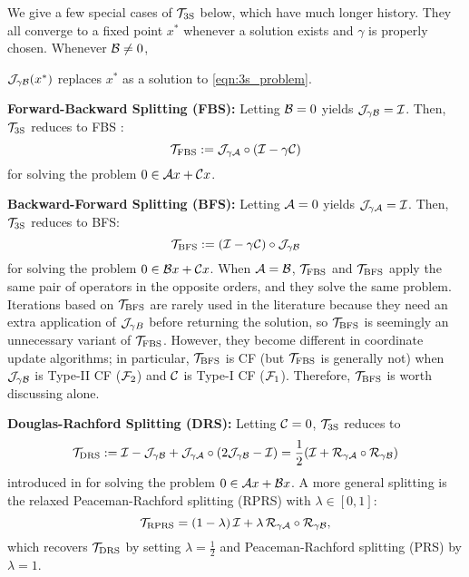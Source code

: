 We give a few special cases of ${{\mathcal{T}}_{\mathrm{3S}}}$ below, which have much longer history. They all converge to a fixed point $x^*$ whenever a solution exists and $\gamma$ is properly chosen. Whenever ${\mathcal{B}}\neq 0$, {${\mathcal{J}}_{\gamma {\mathcal{B}}}(x^*)$ replaces $x^*$  as a solution to \eqref{eqn:3s_problem}.

 \textbf{Forward-Backward Splitting (FBS):} Letting ${\mathcal{B}}=0$ yields ${\mathcal{J}}_{\gamma{\mathcal{B}}}={\mathcal{I}}$. Then, ${{\mathcal{T}}_{\mathrm{3S}}}$ reduces to FBS \cite{passty1979FBS}:
 \begin{equation}\label{eq:FBS}
 \TFBS:=\cJ_{\gamma \cA}\circ(\cI-\gamma \cC)
 \end{equation}
 for solving the problem $0\in{\mathcal{A}} x+{\mathcal{C}} x$.

\textbf{Backward-Forward Splitting (BFS):} Letting ${\mathcal{A}}=0$ yields ${\mathcal{J}}_{\gamma{\mathcal{A}}}={\mathcal{I}}$. Then, ${{\mathcal{T}}_{\mathrm{3S}}}$ reduces to BFS:
  \begin{equation}\label{eq:BFS}\TBFS:=(\cI-\gamma \cC)\circ \cJ_{\gamma \cB}
  \end{equation}
for solving the problem $0\in{\mathcal{B}} x+{\mathcal{C}} x$. When ${\mathcal{A}}={\mathcal{B}}$, ${{\mathcal{T}}_{\mathrm{FBS}}}$ and ${{\mathcal{T}}_{\mathrm{BFS}}}$ apply the same pair of operators in the opposite orders, and they solve the same problem. Iterations based on ${{\mathcal{T}}_{\mathrm{BFS}}}$ are rarely used in the literature because they  need an extra application of ${\mathcal{J}}_{\gamma B}$ before returning the solution, so ${{\mathcal{T}}_{\mathrm{BFS}}}$ is seemingly an unnecessary variant of ${{\mathcal{T}}_{\mathrm{FBS}}}$. However, they become  different in coordinate update algorithms; in particular, ${{\mathcal{T}}_{\mathrm{BFS}}}$ is CF (but ${{\mathcal{T}}_{\mathrm{FBS}}}$ is generally not) when ${\mathcal{J}}_{\gamma {\mathcal{B}}}$ is Type-II CF (${\mathcal{F}}_2$) and ${\mathcal{C}}$ is Type-I CF (${\mathcal{F}}_1$). Therefore, ${{\mathcal{T}}_{\mathrm{BFS}}}$ is worth discussing alone.

\textbf{Douglas-Rachford Splitting (DRS):} Letting ${\mathcal{C}}=0$, ${{\mathcal{T}}_{\mathrm{3S}}}$ reduces to 
  \begin{equation}\label{eq:DRS}\TDRS:=\cI-\cJ_{\gamma \cB}+\cJ_{\gamma\cA}\circ(2\cJ_{\gamma \cB}-\cI)=\frac{1}{2}(\cI+\cR_{\gamma\cA}\circ \cR_{\gamma\cB})
  \end{equation}
introduced in \cite{douglas1956DRS} for solving the problem $0\in{\mathcal{A}} x+{\mathcal{B}} x$. A more general splitting is the  relaxed Peaceman-Rachford splitting (RPRS) with $\lambda\in[0,1]$:
 \begin{equation}
\cT_{\text{RPRS}} = (1 - \lambda)\, \cI + \lambda \, \cR_{\gamma \cA} \circ \cR_{\gamma \cB},
\end{equation}
which recovers ${{\mathcal{T}}_{\mathrm{DRS}}}$ by setting $\lambda=\frac{1}{2}$ and Peaceman-Rachford splitting (PRS) \cite{peaceman1955PRS} by $\lambda=1$.

}
